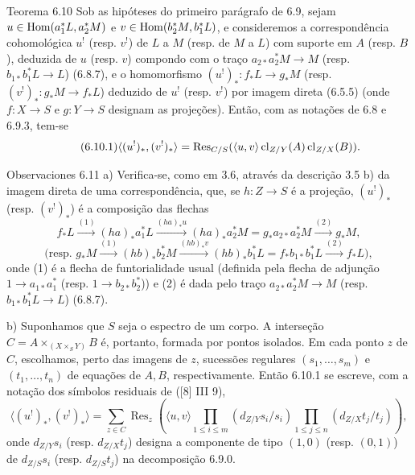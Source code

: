 \begin{statement}{Teorema 6.10}
Sob as hipóteses do primeiro parágrafo de 6.9, sejam $u\in\operatorname{Hom}(a_1^*L,a_2^*M)$ e $v\in\operatorname{Hom}(b_2^*M,b_1^*L)$, e consideremos a correspondência cohomológica $u^!$ (resp. $v^!$) de $L$ a $M$ (resp. de $M$ a $L$) com suporte em $A$ (resp. $B$), deduzida de $u$ (resp. $v$) compondo com o traço $a_{2*}a_2^*M\to M$ (resp. $b_{1*}b_1^*L\to L$) (6.8.7), e o homomorfismo $(u^!)_*:f_*L\to g_*M$ (resp. $(v^!)_*:g_*M\to f_*L$) deduzido de $u^!$ (resp. $v^!$) por imagem direta (6.5.5) (onde $f:X\to S$ e $g:Y\to S$ designam as projeções). Então, com as notações de 6.8 e 6.9.3, tem-se
\begin{equation}
\tag{6.10.1}
\langle (u^!)_*,(v^!)_*\rangle=\operatorname{Res}_{C/S}(\langle u,v\rangle\operatorname{cl}_{Z/Y}(A)\operatorname{cl}_{Z/X}(B)).
\end{equation}
\end{statement}

\begin{statement}{Observaciones 6.11}
a) Verifica-se, como em 3.6, através da descrição 3.5 b) da imagem direta de uma correspondência, que, se $h:Z\to S$ é a projeção, $(u^!)_*$ (resp. $(v^!)_*$) é a composição das flechas
\[
f_*L\xrightarrow{(1)}(ha)_*a_1^*L\xrightarrow{(ha)_*u}(ha)_*a_2^*M=g_*a_{2*}a_2^*M\xrightarrow{(2)}g_*M,
\]
\[
\text{(resp. }g_*M\xrightarrow{(1)}(hb)_*b_2^*M\xrightarrow{(hb)_*v}(hb)_*b_1^*L=f_*b_{1*}b_1^*L\xrightarrow{(2)}f_*L\text{)},
\]
onde (1) é a flecha de funtorialidade usual (definida pela flecha de adjunção $1\to a_{1*}a_1^*$ (resp. $1\to b_{2*}b_2^*$)) e (2) é dada pelo traço $a_{2*}a_2^*M\to M$ (resp. $b_{1*}b_1^*L\to L$) (6.8.7).

b) Suponhamos que $S$ seja o espectro de um corpo. A interseção $C=A\times_{(X\times_S Y)}B$ é, portanto, formada por pontos isolados. Em cada ponto $z$ de $C$, escolhamos, perto das imagens de $z$, sucessões regulares $(s_1,\ldots,s_m)$ e $(t_1,\ldots,t_n)$ de equações de $A,B$, respectivamente. Então 6.10.1 se escreve, com a notação dos símbolos residuais de ([8] III 9),
\begin{equation}
\tag{6.11.1}
\langle (u^!)_*,(v^!)_*\rangle=
\sum_{z\in C}\operatorname{Res}_z\left(\langle u,v\rangle
\prod_{1\le i\le m}(d_{Z/Y}s_i/s_i)
\prod_{1\le j\le n}(d_{Z/X}t_j/t_j)\right),
\end{equation}
onde $d_{Z/Y}s_i$ (resp. $d_{Z/X}t_j$) designa a componente de tipo $(1,0)$ (resp. $(0,1)$) de $d_{Z/S}s_i$ (resp. $d_{Z/S}t_j$) na decomposição 6.9.0.
\end{statement}
